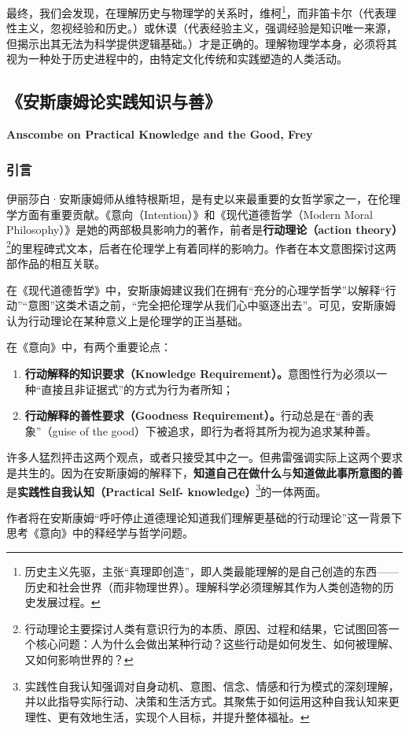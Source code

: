 \documentclass[12pt, a4paper, oneside]{ctexart}
\renewcommand{\b}{\textbf}
\newcommand{\f}{\footnote}
\begin{document}
最终，我们会发现，在理解历史与物理学的关系时，维柯\f{历史主义先驱，主张“真理即创造”，即人类最能理解的是自己创造的东西——历史和社会世界（而非物理世界）。理解科学必须理解其作为人类创造物的历史发展过程。}，而非笛卡尔（代表理性主义，忽视经验和历史。）或休谟（代表经验主义，强调经验是知识唯一来源，但揭示出其无法为科学提供逻辑基础。）才是正确的。理解物理学本身，必须将其视为一种处于历史进程中的，由特定文化传统和实践塑造的人类活动。

\subsection{《安斯康姆论实践知识与善》}
\textbf{Anscombe on Practical Knowledge and the Good, Frey}
\subsubsection{引言}
伊丽莎白·安斯康姆师从维特根斯坦，是有史以来最重要的女哲学家之一，在伦理学方面有重要贡献。《意向（Intention）》和《现代道德哲学（Modern Moral Philosophy）》是她的两部极具影响力的著作，前者是\b{行动理论（action theory）}\f{行动理论主要探讨人类有意识行为的本质、原因、过程和结果，它试图回答一个核心问题：人为什么会做出某种行动？这些行动是如何发生、如何被理解、又如何影响世界的？}的里程碑式文本，后者在伦理学上有着同样的影响力。作者在本文意图探讨这两部作品的相互关联。

在《现代道德哲学》中，安斯康姆建议我们在拥有“充分的心理学哲学”以解释“行动”“意图”这类术语之前，“完全把伦理学从我们心中驱逐出去”。可见，安斯康姆认为行动理论在某种意义上是伦理学的正当基础。

在《意向》中，有两个重要论点：
\begin{enumerate}
    \item \b{行动解释的知识要求（Knowledge Requirement）。}意图性行为必须以一种“直接且非证据式”的方式为行为者所知；
    \item \b{行动解释的善性要求（Goodness Requirement）。}行动总是在“善的表象”（guise of the good）下被追求，即行为者将其所为视为追求某种善。
\end{enumerate}
许多人猛烈抨击这两个观点，或者只接受其中之一。但弗雷强调实际上这两个要求是共生的。因为在安斯康姆的解释下，\b{知道自己在做什么}与\b{知道做此事所意图的善}是\b{实践性自我认知（Practical Self- 
knowledge）}\f{实践性自我认知强调对自身动机、意图、信念、情感和行为模式的深刻理解，并以此指导实际行动、决策和生活方式。其聚焦于如何运用这种自我认知来更理性、更有效地生活，实现个人目标，并提升整体福祉。}的一体两面。

作者将在安斯康姆“呼吁停止道德理论知道我们理解更基础的行动理论”这一背景下思考《意向》中的释经学与哲学问题。
\end{document}

